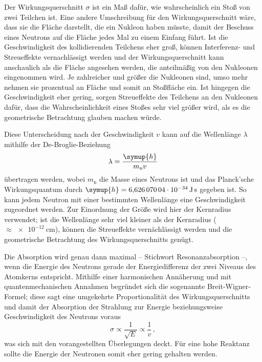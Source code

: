 Der Wirkungsquerschnitt $\sigma$ ist ein Maß dafür, wie wahrscheinlich ein Stoß von zwei Teilchen ist. 
Eine andere Umschreibung für den Wirkungsquerschnitt wäre, dass sie die Fläche darstellt, die ein Nukleon haben müsste, 
damit der Beschuss eines Neutrons auf die Fläche jedes Mal zu einem Einfang führt. 
Ist die Geschwindigkeit des kollidierenden Teilchens eher groß, können Interferenz- und Streueffekte vernachlässigt werden
und der Wirkungsquerschnitt kann anschaulich als die Fläche angesehen werden, die anteilmäßig von den Nukleonen eingenommen wird. 
Je zahlreicher und größer die Nukleonen sind, umso mehr nehmen sie prozentual an Fläche und somit an Stoßfläche ein. 
Ist hingegen die Geschwindigkeit eher gering, sorgen Streueffekte des Teilchens an den Nukleonen dafür, dass die Wahrscheinlichkeit 
eines Stoßes sehr viel größer wird, als es die geometrische Betrachtung glauben machen würde. 

Diese Unterscheidung nach der Geschwindigkeit $v$ kann auf die Wellenlänge $\lambda$ mithilfe der De-Broglie-Beziehung
\begin{equation*}
    \lambda = \frac{\symup{h}}{m_\text{n}v}
\end{equation*}
übertragen werden, wobei $m_\text{n}$ die Masse eines Neutrons ist und das Planck'sche Wirkungsquantum durch ${\symup{h}=\SI{6.62607004e-34}{\joule\second}}$ \cite{scipy} gegeben ist. 
So kann jedem Neutron mit einer bestimmten Wellenlänge eine Geschwindigkeit zugeordnet werden. 
Zur Einordnung der Größe wird hier der Kernradius verwendet; ist die Wellenlänge sehr viel kleiner als der Kernradius ($\approx \SI{e-12}{\centi\meter}$), 
können die Streueffekte vernächlässigt werden und die geometrische Betrachtung des Wirkungsquerschnitts genügt. 

Die Absorption wird genau dann maximal -- Stichwort Resonanzabsorption --, wenn die Energie des Neutrons gerade der Energiedifferenz 
der zwei Niveaus des Atomkerns entspricht. Mithilfe einer harmonischen Annäherung und mit quantenmechanischen Annahmen begründet 
sich die sogenannte Breit-Wigner-Formel; diese sagt eine umgekehrte Proportionalität des Wirkungsquerschnitts und damit der 
Absorption der Strahlung zur Energie beziehungsweise Geschwindigkeit des Neutrons voraus
\begin{equation*}
    \sigma \propto \frac{1}{\sqrt{E}} \propto \frac{1}{v} \,,
\end{equation*}
was sich mit den vorangestellten Überlegungen deckt. 
Für eine hohe Reaktanz sollte die Energie der Neutronen somit eher gering gehalten werden.

